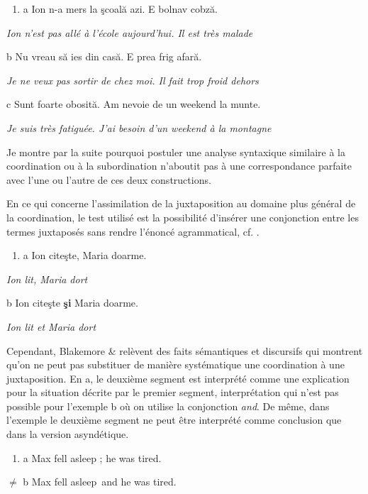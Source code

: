 \begin{enumerate}
\item \label{bkm:Ref273636002}a  Ion n-a mers la şcoală azi. E bolnav cobză.


\end{enumerate}
{\itshape
Ion n'est pas allé à l'école aujourd'hui. Il est très malade}

  b  Nu vreau să ies din casă. E prea frig afară.

{\itshape
Je ne veux pas sortir de chez moi. Il fait trop froid dehors}

  c  Sunt foarte obosită. Am nevoie de un weekend la munte.

    \textit{Je suis très fatiguée. J'ai besoin d'un weekend à la montagne}

Je montre par la suite pourquoi postuler une analyse syntaxique similaire à la coordination ou à la subordination n'aboutit pas à une correspondance parfaite avec l'une ou l'autre de ces deux constructions. 

En ce qui concerne l'assimilation de la juxtaposition au domaine plus général de la coordination, le test utilisé est la possibilité d'insérer une conjonction entre les termes juxtaposés sans rendre l'énoncé agrammatical, cf. .


\begin{enumerate}
\item \label{bkm:Ref301428345}a  Ion citeşte, Maria doarme.


\end{enumerate}
{\itshape
Ion lit, Maria dort}

  b  Ion citeşte \textbf{şi} Maria doarme.

    \textit{Ion lit et Maria dort}

Cependant, Blakemore \& \citet[572]{Carston2005} relèvent des faits sémantiques et discursifs qui montrent qu'on ne peut pas substituer de manière systématique une coordination à une juxtaposition. En a, le deuxième segment est interprété comme une explication pour la situation décrite par le premier segment, interprétation qui n'est pas possible pour l'exemple b où on utilise la conjonction \textit{and}. De même, dans l'exemple  le deuxième segment ne peut être interprété comme conclusion que dans la version asyndétique. 


\begin{enumerate}
\item \label{bkm:Ref272261087}a  Max fell asleep ; he was tired.


\end{enumerate}
\textit{${\neq}$}  b  Max fell asleep~and he was tired.


